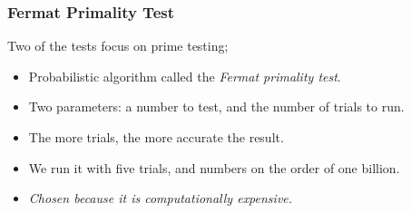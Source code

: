 \documentclass{beamer}
\begin{document}
\begin{frame}
\frametitle{Fermat Primality Test}
Two of the tests focus on prime testing;
	\begin{itemize}
	\item  Probabilistic algorithm called the \emph{Fermat primality test}.
	\item Two parameters: a number to test, and the number of trials to run.
	\item The more trials, the more accurate the result.
	\item We run it with five trials, and numbers on the order of one billion.
	\item \emph{Chosen because it is computationally expensive.}
	\end{itemize}
\end{frame}
\end{document}
